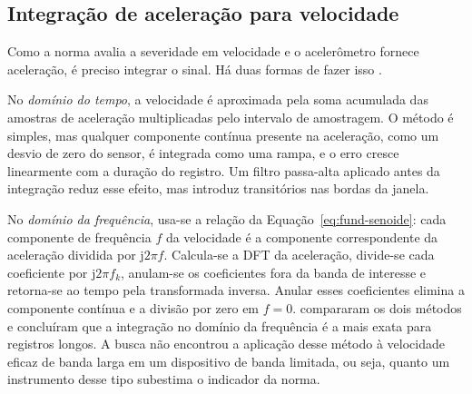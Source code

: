 \begin{table}[!htb]
\end{table}

\subsection{Integração de aceleração para velocidade}
\label{sec:fund-integracao}

Como a norma avalia a severidade em velocidade e o acelerômetro fornece aceleração, é preciso integrar o sinal. Há duas formas de fazer isso
\cite{brandt2014}.

No \emph{domínio do tempo}, a velocidade é aproximada pela soma acumulada das amostras de aceleração multiplicadas pelo intervalo de amostragem. O
método é simples, mas qualquer componente contínua presente na aceleração, como um desvio de zero do sensor, é integrada como uma rampa, e o erro
cresce linearmente com a duração do registro. Um filtro passa-alta aplicado antes da integração reduz esse efeito, mas introduz transitórios nas
bordas da janela.

No \emph{domínio da frequência}, usa-se a relação da Equação~\eqref{eq:fund-senoide}: cada componente de frequência $f$ da velocidade é a componente
correspondente da aceleração dividida por $\mathrm{j}2\pi f$. Calcula-se a DFT da aceleração, divide-se cada coeficiente por $\mathrm{j}2\pi f_k$,
anulam-se os coeficientes fora da banda de interesse e retorna-se ao tempo pela transformada inversa. Anular esses coeficientes elimina a componente
contínua e a divisão por zero em $f = 0$.  compararam os dois métodos e concluíram que a integração no domínio da frequência é
a mais exata para registros longos. A busca não encontrou a aplicação desse método à velocidade eficaz de banda larga em um dispositivo de banda
limitada, ou seja, quanto um instrumento desse tipo subestima o indicador da norma.

